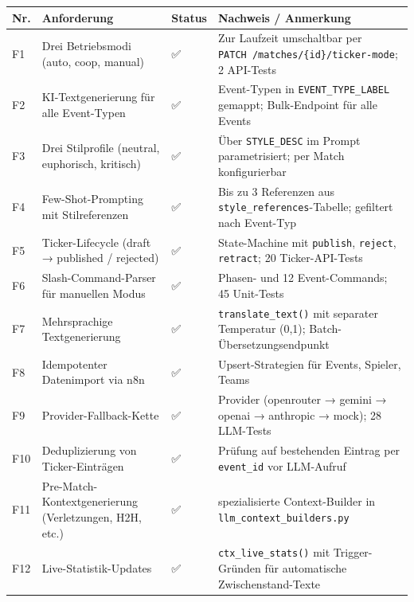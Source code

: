 {\def\LTcaptype{none} %
\begin{longtable}[]{@{}
  >{\raggedright\arraybackslash}p{}
  >{\raggedright\arraybackslash}p{}
  >{\raggedright\arraybackslash}p{}
  >{\raggedright\arraybackslash}p{}@{}}
\toprule\noalign{}
\begin{minipage}[b]{\linewidth}\raggedright
Nr.
\end{minipage} & \begin{minipage}[b]{\linewidth}\raggedright
Anforderung
\end{minipage} & \begin{minipage}[b]{\linewidth}\raggedright
Status
\end{minipage} & \begin{minipage}[b]{\linewidth}\raggedright
Nachweis / Anmerkung
\end{minipage} \\
\midrule\noalign{}
\endhead
\bottomrule\noalign{}
\endlastfoot
F1 & Drei Betriebsmodi (auto, coop, manual) & ✅ & Zur Laufzeit
umschaltbar per \texttt{PATCH\ /matches/\{id\}/ticker-mode}; 2
API-Tests \\
F2 & KI-Textgenerierung für alle Event-Typen & ✅ & 24 Event-Typen in
\texttt{EVENT\_TYPE\_LABEL} gemappt; Bulk-Endpoint für alle Events \\
F3 & Drei Stilprofile (neutral, euphorisch, kritisch) & ✅ & Über
\texttt{STYLE\_DESC} im Prompt parametrisiert; per Match
konfigurierbar \\
F4 & Few-Shot-Prompting mit Stilreferenzen & ✅ & Bis zu 3 Referenzen
aus \texttt{style\_references}-Tabelle; gefiltert nach Event-Typ \\
F5 & Ticker-Lifecycle (draft → published / rejected) & ✅ &
State-Machine mit \texttt{publish}, \texttt{reject}, \texttt{retract};
20 Ticker-API-Tests \\
F6 & Slash-Command-Parser für manuellen Modus & ✅ & 11 Phasen- und 12
Event-Commands; 45 Unit-Tests \\
F7 & Mehrsprachige Textgenerierung & ✅ & \texttt{translate\_text()} mit
separater Temperatur (0,1); Batch-Übersetzungsendpunkt \\
F8 & Idempotenter Datenimport via n8n & ✅ & Upsert-Strategien für
Events, Spieler, Teams \\
F9 & Provider-Fallback-Kette & ✅ & 5 Provider (openrouter → gemini →
openai → anthropic → mock); 28 LLM-Tests \\
F10 & Deduplizierung von Ticker-Einträgen & ✅ & Prüfung auf bestehenden
Eintrag per \texttt{event\_id} vor LLM-Aufruf \\
F11 & Pre-Match-Kontextgenerierung (Verletzungen, H2H, etc.) & ✅ & 7
spezialisierte Context-Builder in \texttt{llm\_context\_builders.py} \\
F12 & Live-Statistik-Updates & ✅ & \texttt{ctx\_live\_stats()} mit
Trigger-Gründen für automatische Zwischenstand-Texte \\
\end{longtable}
}

